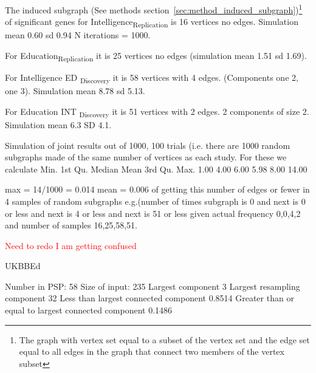 The induced subgraph (See methods section~\ref{sec:method_induced_subgraph})\footnote{The graph with vertex set equal to a subset of the vertex set and the edge set equal to all edges in the graph that connect two members of the vertex subset} of significant genes for Intelligence\textsubscript{Replication} is 16 vertices no edges. Simulation mean 0.60 sd 0.94 N iterations = 1000.

For Education\textsubscript{Replication} it is 25 vertices no edges (simulation mean 1.51 sd 1.69). 

For Intelligence ED  \textsubscript{Discovery} it is 58 vertices with 4 edges. (Components one 2, one 3).  Simulation mean 8.78 sd 5.13.

For Education INT \textsubscript{Discovery} it is 51 vertices with 2 edges. 2 components of size 2.  Simulation mean 6.3 SD 4.1.

Simulation of joint results out of 1000, 100 trials (i.e. there are 1000 random subgraphs made of the same number of vertices as each study. For these we calculate
Min. 1st Qu.  Median    Mean 3rd Qu.    Max. 
   1.00    4.00    6.00    5.98    8.00   14.00 
   
   max = 14/1000 = 0.014
   mean = 0.006 of getting this number of edges or fewer in 4 samples of random subgraphs e.g.(number of times subgraph is 0 and next is 0 or less and next is 4 or less and next is 51 or less given actual frequency 0,0,4,2 and number of samples 16,25,58,51.
   
 \textcolor{red}{Need to redo I am getting confused}

UKBBEd

Number in PSP: 58 
Size of input: 235 
Largest component 3
Largest resampling component 32
Less than largest connected component 0.8514 
Greater than or equal to largest connected component 0.1486



